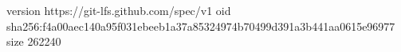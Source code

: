 version https://git-lfs.github.com/spec/v1
oid sha256:f4a00aec140a95f031ebeeb1a37a85324974b70499d391a3b441aa0615e96977
size 262240
